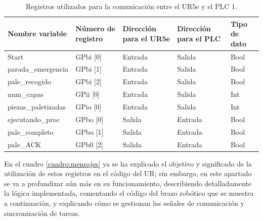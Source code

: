 \begin{table}[H]
\begin{center}

\renewcommand{\arraystretch}{1.5}
\begin{tabular}{|M{3.75cm}|M{2.65cm}|M{3.1cm}|M{2.6cm}|M{2.1cm}|}
\hline
\textbf{Nombre variable} &
\textbf{Número de registro} & 
\textbf{Direcci\'on para el UR5e} & 
\textbf{Direcci\'on para el PLC} &
\textbf{Tipo de dato} \\
\hline
Start  & GPbi [0] & Entrada & Salida & Bool \\
\hline
parada\_emergencia  & GPbi [1] & Entrada & Salida & Bool \\
\hline
pale\_recogido  & GPbi [2] & Entrada & Salida & Bool \\
\hline
num\_capas  & GPii [0] & Entrada & Salida & Int \\
\hline
piezas\_paletizadas  & GPio [0] & Entrada & Salida & Int \\
\hline
ejecutando\_proc  & GPbo [0] & Salida & Entrada & Bool \\
\hline
pale\_completo  & GPbo [1] & Salida & Entrada & Bool \\
\hline
pale\_ACK  & GPb0 [2] & Salida & Entrada & Bool \\
\hline

\end{tabular}

\caption{Registros utilizados para la comunicación entre el UR5e y el PLC 1.}
\label{cuadro:registros}
\end{center}
\end{table}

En el cuadro \ref{cuadro:mensajes} ya se ha explicado el objetivo y significado de la utilización de estos registros en el código del UR; sin embargo, en este apartado se va a profundizar aún más en su funcionamiento, describiendo detalladamente la lógica implementada, comentando el código del brazo robótico que se muestra a continuación, y explicando cómo se gestionan las señales de comunicación y sincronización de tareas.

